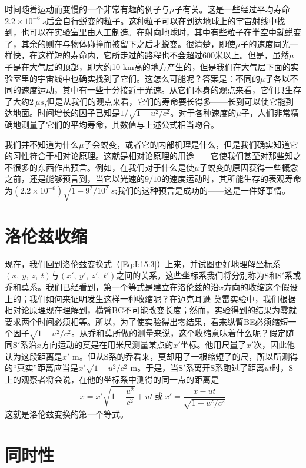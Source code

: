 时间随着运动而变慢的一个非常有趣的例子与$\mu$子有关。这是一些经过平均寿命$2.2 \times 10^{-6}~s$后会自行蜕变的粒子。这种粒子可以在到达地球上的宇宙射线中找到，也可以在实验室里由人工制造。在射向地球时，其中有些粒子在半空中就蜕变了，其余的则在与物体碰撞而被留下之后才蜕变。很清楚，即使$\mu$子的速度同光一样快，在这样短的寿命内，它所走过的路程也不会超过600米以上。但是，虽然$\mu$子是在大气层的顶部，即大约10 km高的地方产生的，但是我们在大气层下面的实验室里的宇宙线中也确实找到了它们。这怎么可能呢？答案是：不同的$\mu$子各以不同的速度运动，其中有一些十分接近于光速。从它们本身的观点来看，它们只生存了大约$2~\mu s$,但是从我们的观点来看，它们的寿命要长得多——长到可以使它能到达地面。时间增长的因子已知是$1/\sqrt{1-u^2/c^2}$。对于各种速度的$\mu$子，人们非常精确地测量了它们的平均寿命，其数值与上述公式相当吻合。

我们并不知道为什么$\mu$子会蜕变，或者它的内部机理是什么，但是我们确实知道它的习性符合于相对论原理。这就是相对论原理的用途——它使我们甚至对那些知之不很多的东西作出预言。例如，在我们对于什么是使$\mu$子蜕变的原因获得一些概念之前，还是能够预言到，当它以光速的$9/10$的速度运动时，其所能生存的表观寿命为$(2.2 \times 10^{-6})\sqrt{1-9^2/10^2}~s$;我们的这种预言是成功的——这是一件好事情。

\section{洛伦兹收缩}

现在，我们回到洛伦兹变换式（\ref{Eq:I:15:3}）上来，并试图更好地理解坐标系$(x,~y,~z,~t)$与$(x',~y',~z',~t')$之间的关系。这些坐标系我们将分别称为S和S$'$系或乔和莫系。我们已经看到，第一个等式是建立在洛伦兹的沿$x$方向的收缩这个假设上的；我们如何来证明发生这样一种收缩呢？在迈克耳逊-莫雷实验中，我们根据相对论原理现在理解到，横臂BC不可能改变长度；然而，实验得到的结果为零就要求两个时间必须相等。所以，为了使实验得出零结果，看来纵臂BE必须缩短一个因子$\sqrt{1-u^2/c^2}$。从乔和莫所做的测量来说，这个收缩意味着什么呢？假定随同S$'$系沿$x$方向运动的莫是在用米尺测量某点的$x'$坐标。他用尺量了$x'$次，因此他认为这段距离是$x'$ m。但从S系的乔看来，莫却用了一根缩短了的尺，所以所测得的“真实”距离应当是$x'\sqrt{1-u^2/c^2}$ m。于是，当S$'$系离开S系跑过了距离$ut$时，S上的观察者将会说，在他的坐标系中测得的同一点的距离是
\begin{equation*}
    x=x'\sqrt{1-\frac{u^2}{c^2}}+ut~\text{或}~x'=\frac{x-ut}{\sqrt{1-u^2/c^2}}
\end{equation*}
这就是洛伦兹变换的第一个等式。

\section{同时性}

